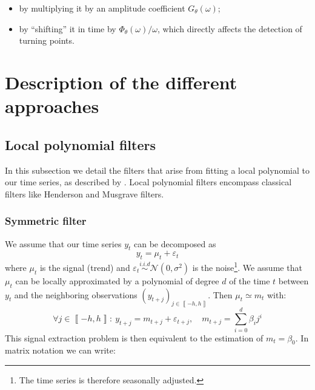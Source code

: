 \documentclass[fleqn,10pt]{latex/stylish_article} %
\newcommand\1{\mathds{1}}
\begin{document}
\begin{itemize}
\item
  by multiplying it by an amplitude coefficient \(G_{\theta}\left(\omega\right)\);
\item
  by ``shifting'' it in time by \(\Phi_\theta(\omega)/\omega\), which directly affects the detection of turning points.
\end{itemize}

\hypertarget{description-of-the-different-approaches}{%
\section{Description of the different approaches}\label{description-of-the-different-approaches}}

\hypertarget{sec:lppfilters}{%
\subsection{Local polynomial filters}\label{sec:lppfilters}}

In this subsection we detail the filters that arise from fitting a local polynomial to our time series, as described by \citet{proietti2008}.
Local polynomial filters encompass classical filters like Henderson and Musgrave filters.

\hypertarget{symmetric-filter}{%
\subsubsection{Symmetric filter}\label{symmetric-filter}}

We assume that our time series \(y_t\) can be decomposed as
\[
y_t=\mu_t+\varepsilon_t
\]
where \(\mu_t\) is the signal (trend) and \(\varepsilon_{t}\overset{i.i.d}{\sim}\mathcal{N}(0,\sigma^{2})\) is the noise\footnote{The time series is therefore seasonally adjusted.}.
We assume that \(\mu_t\) can be locally approximated by a polynomial of degree \(d\) of the time \(t\) between \(y_t\) and the neighboring observations \(\left(y_{t+j}\right)_{j\in\left\llbracket -h,h\right\rrbracket}\).
Then \(\mu_t\simeq m_{t}\) with:
\[
\forall j\in\left\llbracket -h,h\right\rrbracket :\:
y_{t+j}=m_{t+j}+\varepsilon_{t+j},\quad m_{t+j}=\sum_{i=0}^{d}\beta_{i}j^{i}
\]
This signal extraction problem is then equivalent to the estimation of \(m_t=\beta_0\). In matrix notation we can write:
\end{document}
